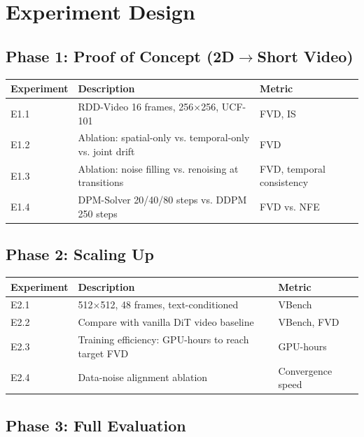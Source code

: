 \documentclass[11pt,a4paper]{article}
\begin{document}
\section{Experiment Design}

\subsection{Phase 1: Proof of Concept (2D$\to$Short Video)}

\begin{table}[h]
\centering
\begin{tabular}{lll}
\toprule
Experiment & Description & Metric \\
\midrule
E1.1 & RDD-Video 16 frames, 256$\times$256, UCF-101 & FVD, IS \\
E1.2 & Ablation: spatial-only vs. temporal-only vs. joint drift & FVD \\
E1.3 & Ablation: noise filling vs. renoising at transitions & FVD, temporal consistency \\
E1.4 & DPM-Solver 20/40/80 steps vs. DDPM 250 steps & FVD vs. NFE \\
\bottomrule
\end{tabular}
\end{table}

\subsection{Phase 2: Scaling Up}

\begin{table}[h]
\centering
\begin{tabular}{lll}
\toprule
Experiment & Description & Metric \\
\midrule
E2.1 & 512$\times$512, 48 frames, text-conditioned & VBench \\
E2.2 & Compare with vanilla DiT video baseline & VBench, FVD \\
E2.3 & Training efficiency: GPU-hours to reach target FVD & GPU-hours \\
E2.4 & Data-noise alignment ablation & Convergence speed \\
\bottomrule
\end{tabular}
\end{table}

\subsection{Phase 3: Full Evaluation}
\end{document}
